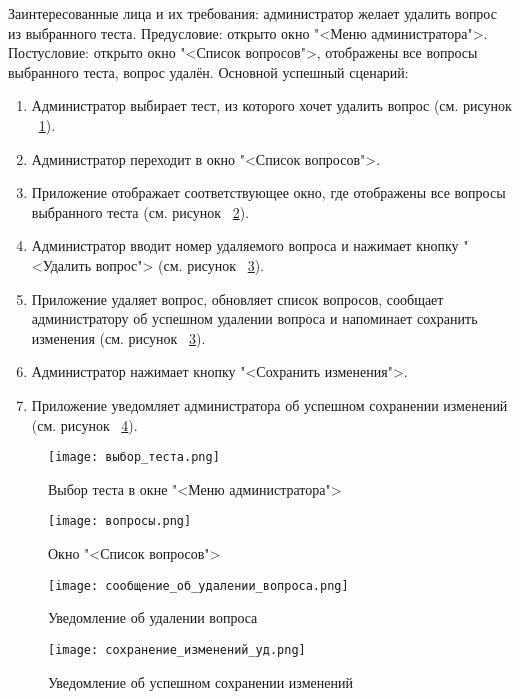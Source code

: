 Заинтересованные лица и их требования: администратор желает удалить вопрос из выбранного теста.
\newline Предусловие: открыто окно "<Меню администратора">.
\newline Постусловие: открыто окно "<Список вопросов">, отображены все вопросы выбранного теста, вопрос удалён.
\newline Основной успешный сценарий:
\begin{enumerate}
	\item Администратор выбирает тест, из которого хочет удалить вопрос (см. рисунок ~\ref{select_test:image}).
	\item Администратор переходит в окно "<Список вопросов">.
	\item Приложение отображает соответствующее окно, где отображены все вопросы выбранного теста (см. рисунок ~\ref{questions_window:image}).
	\item Администратор вводит номер удаляемого вопроса и нажимает кнопку "<Удалить вопрос"> (см. рисунок ~\ref{deleting_complete:image}).
	\item Приложение удаляет вопрос, обновляет список вопросов, сообщает администратору об успешном удалении вопроса и напоминает сохранить изменения (см. рисунок ~\ref{deleting_complete:image}).
	\item Администратор нажимает кнопку "<Сохранить изменения">.
	\item Приложение уведомляет администратора об успешном сохранении изменений (см. рисунок ~\ref{save_notification:image}).
\end{enumerate}

\begin{figure}[H]
	\centering
	\texttt{[image: выбор\_теста.png]}
	\caption{Выбор теста в окне "<Меню администратора">}
	\label{select_test:image}
\end{figure}
\begin{figure}[H]
	\centering
	\texttt{[image: вопросы.png]}
	\caption{Окно "<Список вопросов">}
	\label{questions_window:image}
\end{figure}
\begin{figure}[H]
	\centering
	\texttt{[image: сообщение\_об\_удалении\_вопроса.png]}
	\caption{Уведомление об удалении вопроса}
	\label{deleting_complete:image}
\end{figure}
\begin{figure}[H]
	\centering
	\texttt{[image: сохранение\_изменений\_уд.png]}
	\caption{Уведомление об успешном сохранении изменений}
	\label{save_notification:image}
\end{figure}

